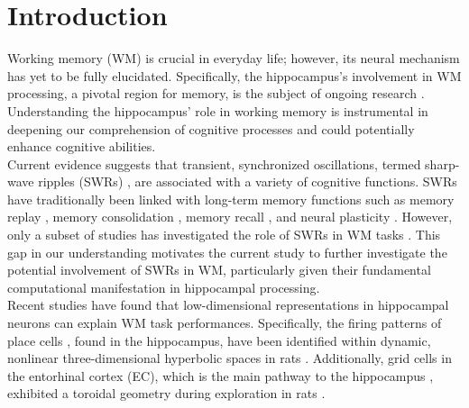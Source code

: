 \section{Introduction}
Working memory (WM) is crucial in everyday life; however, its neural mechanism has yet to be fully elucidated. Specifically, the hippocampus's involvement in WM processing, a pivotal region for memory, is the subject of ongoing research \cite{scoville_loss_1957, squire_legacy_2009, boran_persistent_2019, kaminski_persistently_2017, kornblith_persistent_2017, faraut_dataset_2018, borders_hippocampus_2022, li_functional_2023, dimakopoulos_information_2022}. Understanding the hippocampus’ role in working memory is instrumental in deepening our comprehension of cognitive processes and could potentially enhance cognitive abilities.
\\
\indent
Current evidence suggests that transient, synchronized oscillations, termed sharp-wave ripples (SWRs) \cite{buzsaki_hippocampal_2015}, are associated with a variety of cognitive functions. SWRs have traditionally been linked with long-term memory functions such as memory replay \cite{wilson_reactivation_1994, nadasdy_replay_1999, lee_memory_2002, diba_forward_2007, davidson_hippocampal_2009}, memory consolidation \cite{girardeau_selective_2009, ego-stengel_disruption_2010, fernandez-ruiz_long-duration_2019, kim_corticalhippocampal_2022}, memory recall \cite{wu_hippocampal_2017, norman_hippocampal_2019, norman_hippocampal_2021}, and neural plasticity \cite{behrens_induction_2005, norimoto_hippocampal_2018}. However, only a subset of studies has investigated the role of SWRs in WM tasks \cite{jadhav_awake_2012, sasaki_dentate_2018}. This gap in our understanding motivates the current study to further investigate the potential involvement of SWRs in WM, particularly given their fundamental computational manifestation in hippocampal processing.
\\
\indent
Recent studies have found that low-dimensional representations in hippocampal neurons can explain WM task performances. Specifically, the firing patterns of place cells \cite{okeefe_hippocampus_1971, okeefe_place_1976, ekstrom_cellular_2003, kjelstrup_finite_2008, harvey_intracellular_2009}, found in the hippocampus, have been identified within dynamic, nonlinear three-dimensional hyperbolic spaces in rats \cite{zhang_hippocampal_2022}. Additionally, grid cells in the entorhinal cortex (EC), which is the main pathway to the hippocampus \cite{naber_reciprocal_2001, van_strien_anatomy_2009, strange_functional_2014}, exhibited a toroidal geometry during exploration in rats \cite{gardner_toroidal_2022}.
